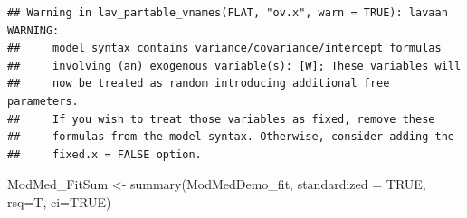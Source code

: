 \documentclass[
  english,
]{book}
\newenvironment{Shaded}{\begin{snugshade}}{\end{snugshade}}
\newcommand{\AttributeTok}[1]{\textcolor[rgb]{0.77,0.63,0.00}{#1}}
\newcommand{\ConstantTok}[1]{\textcolor[rgb]{0.00,0.00,0.00}{#1}}
\newcommand{\FunctionTok}[1]{\textcolor[rgb]{0.00,0.00,0.00}{#1}}
\newcommand{\NormalTok}[1]{#1}
\newcommand{\OtherTok}[1]{\textcolor[rgb]{0.56,0.35,0.01}{#1}}
\begin{document}
\begin{verbatim}
## Warning in lav_partable_vnames(FLAT, "ov.x", warn = TRUE): lavaan WARNING:
##     model syntax contains variance/covariance/intercept formulas
##     involving (an) exogenous variable(s): [W]; These variables will
##     now be treated as random introducing additional free parameters.
##     If you wish to treat those variables as fixed, remove these
##     formulas from the model syntax. Otherwise, consider adding the
##     fixed.x = FALSE option.
\end{verbatim}

\begin{Shaded}
\begin{Highlighting}[]
\NormalTok{ModMed\_FitSum }\OtherTok{\textless{}{-}} \FunctionTok{summary}\NormalTok{(ModMedDemo\_fit, }\AttributeTok{standardized =} \ConstantTok{TRUE}\NormalTok{, }\AttributeTok{rsq=}\NormalTok{T, }\AttributeTok{ci=}\ConstantTok{TRUE}\NormalTok{)    }
\end{Highlighting}
\end{Shaded}
\end{document}
